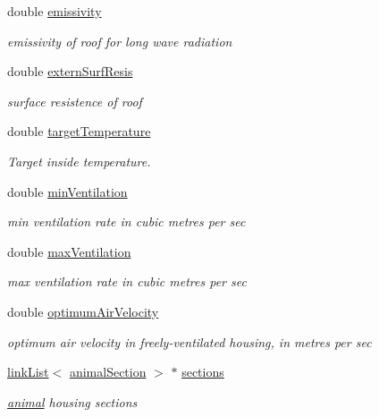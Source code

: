 \begin{DoxyCompactItemize}
double \hyperlink{classstable_a19ded1916302f2b2a616f5aef49b3d56}{emissivity}
\begin{DoxyCompactList}\small\item\em emissivity of roof for long wave radiation \item\end{DoxyCompactList}\item 
double \hyperlink{classstable_ae2a0976b43911d11324350d18211b1ed}{externSurfResis}
\begin{DoxyCompactList}\small\item\em surface resistence of roof \item\end{DoxyCompactList}\item 
double \hyperlink{classstable_a1c1bad0f5a3fdbf212f8396eda0d29b2}{targetTemperature}
\begin{DoxyCompactList}\small\item\em Target inside temperature. \item\end{DoxyCompactList}\item 
double \hyperlink{classstable_ac9723b32bae1707d7b962f446d10627a}{minVentilation}
\begin{DoxyCompactList}\small\item\em min ventilation rate in cubic metres per sec \item\end{DoxyCompactList}\item 
double \hyperlink{classstable_a57f84982eb9851ab84277c3a823a967d}{maxVentilation}
\begin{DoxyCompactList}\small\item\em max ventilation rate in cubic metres per sec \item\end{DoxyCompactList}\item 
double \hyperlink{classstable_a8b86c3ce1b5b2b45d21944e13e417f0d}{optimumAirVelocity}
\begin{DoxyCompactList}\small\item\em optimum air velocity in freely-\/ventilated housing, in metres per sec \item\end{DoxyCompactList}\item 
\hyperlink{classlink_list}{linkList}$<$ \hyperlink{classanimal_section}{animalSection} $>$ $\ast$ \hyperlink{classstable_acb077d73e0190efa9c1359d03515d991}{sections}
\begin{DoxyCompactList}\small\item\em \hyperlink{classanimal}{animal} housing sections \item\end{DoxyCompactList}\item 

\end{DoxyCompactItemize}
